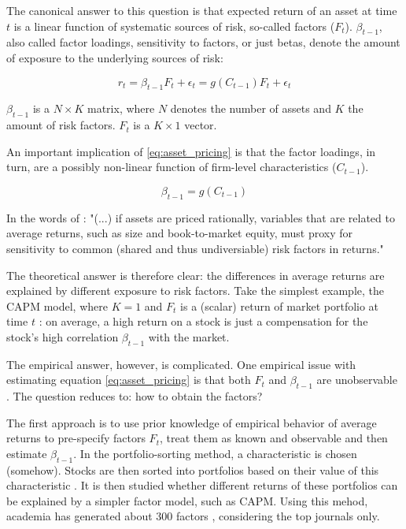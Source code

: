	 	The canonical answer to this question is that expected return of an asset at time $t$ is a linear function of systematic sources of risk, so-called factors ($F_t$). $\beta_{t-1}$, also called factor loadings, sensitivity to factors, or just betas, denote the amount of exposure to the underlying sources of risk: 
			
		\begin{equation}
			r_t = \beta_{t-1}F_t + \epsilon_t  = g(C_{t-1})F_t + \epsilon_t \label{eq:asset_pricing}
		\end{equation}
	
		
		$\beta_{t-1}$ is a $N \times K$ matrix, where $N$ denotes the number of assets and $K$ the amount of risk factors. $F_t$ is a $K \times1 $ vector.
		
		An important implication of \ref{eq:asset_pricing} is that the factor loadings, in turn, are a possibly non-linear function of firm-level characteristics ($C_{t-1}$). 
			
		\begin{equation}
			\beta_{t-1}= g(C_{t-1})\label{eq:characteristics_as_proxies}
		\end{equation}
		
		In the words of \cite{fama1993common}: "(...) if assets are priced rationally, variables that are
		related to average returns, such as size and book-to-market equity, must proxy for
		sensitivity to common (shared and thus undiversiable) risk factors in returns." 	
		
		The theoretical answer is therefore clear: the differences in average returns are explained by different exposure to risk factors. 
		Take the simplest example, the CAPM model, where $K=1$ and $F_t$ is a (scalar) return of market portfolio at time $t$ \citep{cochrane2009asset}: on average, a high return on a stock is just a compensation for the stock's high correlation $\beta_{t-1}$ with the market. 
		
		The empirical answer, however, is complicated. One empirical issue with estimating equation \ref{eq:asset_pricing} is that both $F_t$ and $\beta_{t-1}$ are unobservable \citep{kelly2019characteristics}. The question reduces to: how to obtain the factors? 
		
		The first approach is to use prior knowledge of empirical behavior of average returns to pre-specify factors $F_t$, treat them as known and observable and then estimate $\beta_{t-1}$. In the portfolio-sorting method, a characteristic is chosen (somehow). Stocks are then sorted into portfolios based on their value of this characteristic \citep{fama1993common}. It is then studied whether different returns of these portfolios can be explained by a simpler factor model, such as CAPM. Using this mehod, academia has generated about 300 factors \citep{harvey2016and}, considering the top journals only.
		
